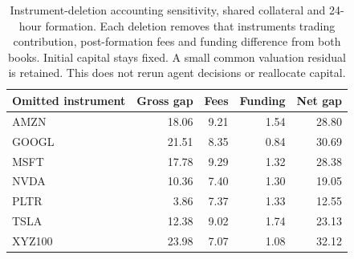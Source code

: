 \begin{table}[htbp]
\centering\small
\caption{Instrument-deletion accounting sensitivity, shared collateral and 24-hour formation. Each deletion removes that instrument\textquotesingle{}s trading contribution, post-formation fees and funding difference from both books. Initial capital stays fixed. A small common valuation residual is retained. This does not rerun agent decisions or reallocate capital.}
\label{tab:feedbackinstrument}
\begin{tabular}{lrrrr}
\toprule
Omitted instrument & Gross gap & Fees & Funding & Net gap \\
\midrule
AMZN & 18.06 & 9.21 & 1.54 & 28.80 \\
GOOGL & 21.51 & 8.35 & 0.84 & 30.69 \\
MSFT & 17.78 & 9.29 & 1.32 & 28.38 \\
NVDA & 10.36 & 7.40 & 1.30 & 19.05 \\
PLTR & 3.86 & 7.37 & 1.33 & 12.55 \\
TSLA & 12.38 & 9.02 & 1.74 & 23.13 \\
XYZ100 & 23.98 & 7.07 & 1.08 & 32.12 \\
\bottomrule
\end{tabular}
\end{table}
